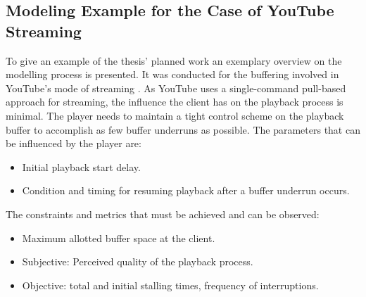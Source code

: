 


  
\subsection{Modeling Example for the Case of YouTube Streaming}

To give an example of the thesis' planned work an exemplary overview on the modelling process is presented. It was conducted for the buffering involved in YouTube's mode of streaming \cite{metzger2011delivery}. As YouTube uses a single-command pull-based approach for streaming, the influence the client has on the playback process is minimal. The player needs to maintain a tight control scheme on the playback buffer to accomplish as few buffer underruns as possible. The parameters that can be influenced by the player are: 

\begin{itemize}
\item Initial playback start delay.
\item Condition and timing for resuming playback after a buffer underrun occurs.
\end{itemize}

The constraints and metrics that must be achieved and can be observed:

\begin{itemize}
\item Maximum allotted buffer space at the client.
\item Subjective: Perceived quality of the playback process.
\item Objective: total and initial stalling times, frequency of interruptions.
\end{itemize}

